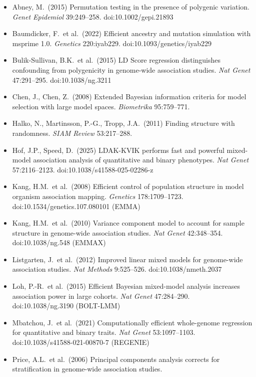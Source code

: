 \documentclass[11pt]{article}
\begin{document}
\begin{itemize}[nosep,leftmargin=1.4em]
\item Abney, M.\ (2015) Permutation testing in the presence of polygenic
  variation. \emph{Genet Epidemiol} 39:249--258. doi:10.1002/gepi.21893
\item Baumdicker, F.\ et al.\ (2022) Efficient ancestry and mutation
  simulation with msprime 1.0. \emph{Genetics} 220:iyab229.
  doi:10.1093/genetics/iyab229
\item Bulik-Sullivan, B.K.\ et al.\ (2015) LD Score regression
  distinguishes confounding from polygenicity in genome-wide association
  studies. \emph{Nat Genet} 47:291--295. doi:10.1038/ng.3211
\item Chen, J., Chen, Z.\ (2008) Extended Bayesian information criteria
  for model selection with large model spaces. \emph{Biometrika}
  95:759--771.
\item Halko, N., Martinsson, P.-G., Tropp, J.A.\ (2011) Finding
  structure with randomness. \emph{SIAM Review} 53:217--288.
\item Hof, J.P., Speed, D.\ (2025) LDAK-KVIK performs fast and powerful
  mixed-model association analysis of quantitative and binary
  phenotypes. \emph{Nat Genet} 57:2116--2123.
  doi:10.1038/s41588-025-02286-z
\item Kang, H.M.\ et al.\ (2008) Efficient control of population
  structure in model organism association mapping. \emph{Genetics}
  178:1709--1723. doi:10.1534/genetics.107.080101 (EMMA)
\item Kang, H.M.\ et al.\ (2010) Variance component model to account
  for sample structure in genome-wide association studies.
  \emph{Nat Genet} 42:348--354. doi:10.1038/ng.548 (EMMAX)
\item Listgarten, J.\ et al.\ (2012) Improved linear mixed models for
  genome-wide association studies. \emph{Nat Methods} 9:525--526.
  doi:10.1038/nmeth.2037
\item Loh, P.-R.\ et al.\ (2015) Efficient Bayesian mixed-model analysis
  increases association power in large cohorts. \emph{Nat Genet}
  47:284--290. doi:10.1038/ng.3190 (BOLT-LMM)
\item Mbatchou, J.\ et al.\ (2021) Computationally efficient
  whole-genome regression for quantitative and binary traits.
  \emph{Nat Genet} 53:1097--1103. doi:10.1038/s41588-021-00870-7 (REGENIE)
\item Price, A.L.\ et al.\ (2006) Principal components analysis
  corrects for stratification in genome-wide association studies.

\end{itemize}
\end{document}
